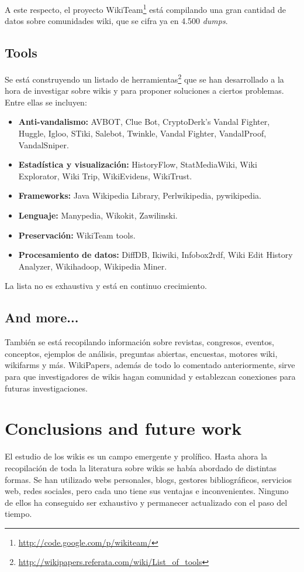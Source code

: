 \documentclass[11pt,twocolumn]{article}
\begin{document}
A este respecto, el proyecto WikiTeam\footnote{\href{http://code.google.com/p/wikiteam/}{http://code.google.com/p/wikiteam/}} está compilando una gran cantidad de datos sobre comunidades wiki, que se cifra ya en 4.500 \emph{dumps}.

\subsection{Tools}
Se está construyendo un listado de herramientas\footnote{\href{http://wikipapers.referata.com/wiki/List_of_tools}{http://wikipapers.referata.com/wiki/List\_of\_tools}} que se han desarrollado a la hora de investigar sobre wikis y para proponer soluciones a ciertos problemas. Entre ellas se incluyen:

\begin{itemize}
\item \textbf{Anti-vandalismo:} AVBOT, Clue Bot, CryptoDerk's Vandal Fighter, Huggle, Igloo, STiki, Salebot, Twinkle, Vandal Fighter, VandalProof, VandalSniper.
\item \textbf{Estadística y visualización:} HistoryFlow, StatMediaWiki, Wiki Explorator, Wiki Trip, WikiEvidens, WikiTrust.
\item \textbf{Frameworks:} Java Wikipedia Library, Perlwikipedia, pywikipedia.
\item \textbf{Lenguaje:} Manypedia, Wikokit, Zawilinski.
\item \textbf{Preservación:} WikiTeam tools.
\item \textbf{Procesamiento de datos:} DiffDB, Ikiwiki, Infobox2rdf, Wiki Edit History Analyzer, Wikihadoop, Wikipedia Miner.
\end{itemize}

La lista no es exhaustiva y está en continuo crecimiento.

\subsection{And more...}
También se está recopilando información sobre revistas, congresos, eventos, conceptos, ejemplos de análisis, preguntas abiertas, encuestas, motores wiki, wikifarms y más. WikiPapers, además de todo lo comentado anteriormente, sirve para que investigadores de wikis hagan comunidad y establezcan conexiones para futuras investigaciones.

\section{Conclusions and future work}
El estudio de los wikis es un campo emergente y prolífico. Hasta ahora la recopilación de toda la literatura sobre wikis se había abordado de distintas formas. Se han utilizado webs personales, blogs, gestores bibliográficos, servicios web, redes sociales, pero cada uno tiene sus ventajas e inconvenientes. Ninguno de ellos ha conseguido ser exhaustivo y permanecer actualizado con el paso del tiempo.
\end{document}
